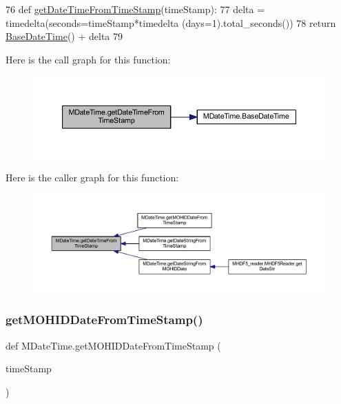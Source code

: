 \begin{DoxyCode}
76 \textcolor{keyword}{def }\mbox{\hyperlink{namespace_m_date_time_abecc2e4333a1a4191e5b1243cf98131d}{getDateTimeFromTimeStamp}}(timeStamp):
77     delta = timedelta(seconds=timeStamp*timedelta (days=1).total\_seconds())
78     \textcolor{keywordflow}{return} \mbox{\hyperlink{namespace_m_date_time_a3e8d38d306730c6707a17503e2d21d6c}{BaseDateTime}}() + delta
79 
\end{DoxyCode}
Here is the call graph for this function\+:\nopagebreak
\begin{figure}[H]
\begin{center}
\leavevmode
\includegraphics[width=350pt]{namespace_m_date_time_abecc2e4333a1a4191e5b1243cf98131d_cgraph}
\end{center}
\end{figure}
Here is the caller graph for this function\+:\nopagebreak
\begin{figure}[H]
\begin{center}
\leavevmode
\includegraphics[width=350pt]{namespace_m_date_time_abecc2e4333a1a4191e5b1243cf98131d_icgraph}
\end{center}
\end{figure}
\mbox{\label{namespace_m_date_time_a0bb2bb194a0935f8ffee0022899d73a5}} 
\subsubsection{\texorpdfstring{get\+M\+O\+H\+I\+D\+Date\+From\+Time\+Stamp()}{getMOHIDDateFromTimeStamp()}}
{\footnotesize\ttfamily def M\+Date\+Time.\+get\+M\+O\+H\+I\+D\+Date\+From\+Time\+Stamp (\begin{DoxyParamCaption}\item[{}]{time\+Stamp }\end{DoxyParamCaption})}



